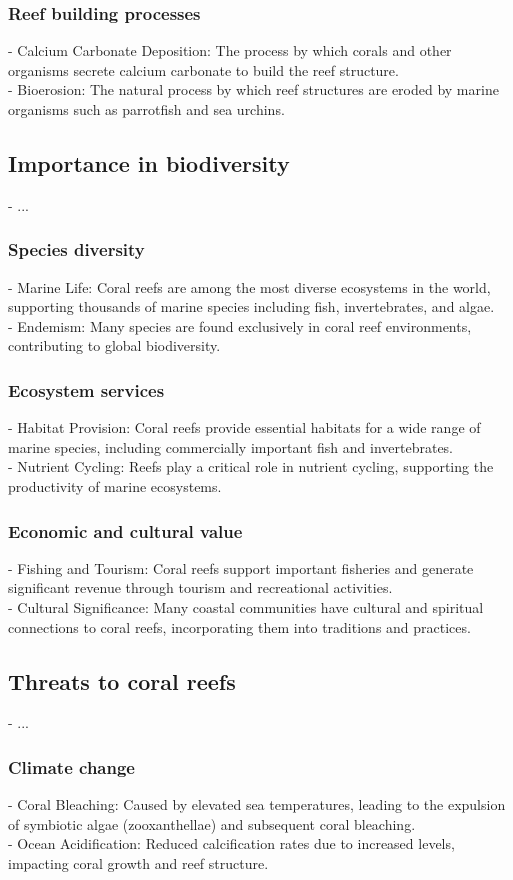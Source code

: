 \subsubsection{Reef building processes}
- Calcium Carbonate Deposition: The process by which corals and other organisms secrete calcium carbonate to build the reef structure. \\
- Bioerosion: The natural process by which reef structures are eroded by marine organisms such as parrotfish and sea urchins.

\subsection{Importance in biodiversity}
- ... 
\subsubsection{Species diversity}
- Marine Life: Coral reefs are among the most diverse ecosystems in the world, supporting thousands of marine species including fish, invertebrates, and algae. \\
- Endemism: Many species are found exclusively in coral reef environments, contributing to global biodiversity.
\subsubsection{Ecosystem services}
- Habitat Provision: Coral reefs provide essential habitats for a wide range of marine species, including commercially important fish and invertebrates. \\
- Nutrient Cycling: Reefs play a critical role in nutrient cycling, supporting the productivity of marine ecosystems. 
\subsubsection{Economic and cultural value}
- Fishing and Tourism: Coral reefs support important fisheries and generate significant revenue through tourism and recreational activities. \\
- Cultural Significance: Many coastal communities have cultural and spiritual connections to coral reefs, incorporating them into traditions and practices.

\subsection{Threats to coral reefs}
- ... 
\subsubsection{Climate change}
- Coral Bleaching: Caused by elevated sea temperatures, leading to the expulsion of symbiotic algae (zooxanthellae) and subsequent coral bleaching. \\
- Ocean Acidification: Reduced calcification rates due to increased  levels, impacting coral growth and reef structure.
